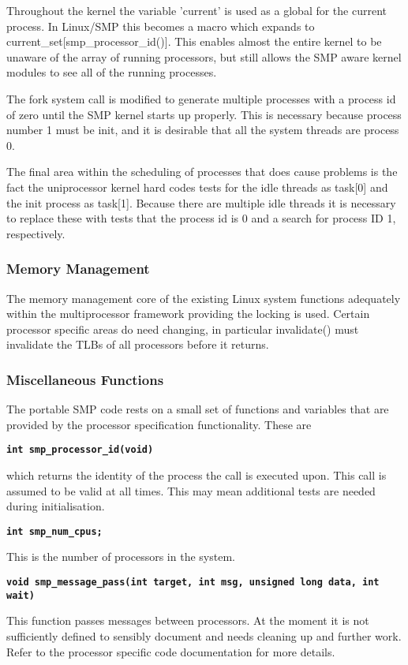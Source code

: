\documentclass[]{article}
\begin{document}
Throughout the kernel the variable 'current' is used as a global for the 
current process. In Linux/SMP this becomes a macro which expands to 
current\_set[smp\_processor\_id()]. This enables almost the entire kernel to 
be unaware of the array of running processors, but still allows the SMP 
aware kernel modules to see all of the running processes.

The fork system call is modified to generate multiple processes with a 
process id of zero until the SMP kernel starts up properly. This is 
necessary because process number 1 must be init, and it is desirable that 
all the system threads are process 0. 

The final area within the scheduling of processes that does cause problems 
is the fact the uniprocessor kernel hard codes tests for the idle threads 
as task[0] and the init process as task[1]. Because there are multiple idle 
threads it is necessary to replace these with tests that the process id is 
0 and a search for process ID 1, respectively.

\subsubsection{Memory Management}
The memory management core of the existing Linux system functions 
adequately within the multiprocessor framework providing the locking is 
used. Certain processor specific areas do need changing, in particular 
invalidate() must invalidate the TLBs of all processors before it returns.


\subsubsection{Miscellaneous Functions}
The portable SMP code rests on a small set of functions and variables 
that are provided by the processor specification functionality. These are

{\tt \bf int smp\_processor\_id(void) }

which returns the identity of the process the call is executed upon. This 
call is assumed to be valid at all times. This may mean additional tests 
are needed during initialisation.


{\tt \bf int smp\_num\_cpus;}

This is the number of processors in the system. \

{\tt \bf void smp\_message\_pass(int target, int msg, unsigned long data,
		int wait)}

This function passes messages between processors. At the moment it is not 
sufficiently defined to sensibly document and needs cleaning up and further 
work. Refer to the processor specific code documentation for more details.
\end{document}

